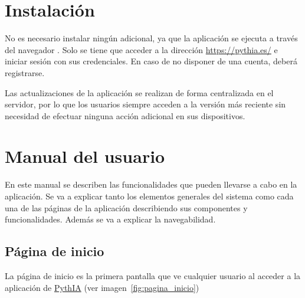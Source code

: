 \section{Instalación}
\label{usu:inst}

No es necesario instalar ningún  adicional, ya que la aplicación se ejecuta a través del navegador . Solo se tiene que acceder a la dirección \url{https://pythia.es/} e iniciar sesión con sus credenciales. En caso de no disponer de una cuenta, deberá registrarse.

Las actualizaciones de la aplicación se realizan de forma centralizada en el servidor, por lo que los usuarios siempre acceden a la versión más reciente sin necesidad de efectuar ninguna acción adicional en sus dispositivos.

\section{Manual del usuario}
\label{usu:manual}

En este manual se describen las funcionalidades que pueden llevarse a cabo en la aplicación. Se va a explicar tanto los elementos generales del sistema como cada una de las páginas de la aplicación describiendo sus componentes y funcionalidades. Además se va a explicar la navegabilidad.

\subsection{Página de inicio}
\label{manual:inicio}

La página de inicio es la primera pantalla que ve cualquier usuario al acceder a la aplicación  de \href{https://pythia.es/}{PythIA} (ver imagen~\ref{fig:pagina_inicio})

